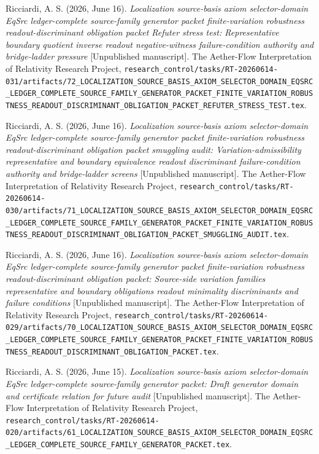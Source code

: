 \documentclass[11pt]{article}
\begin{document}
Ricciardi, A. S. (2026, June 16). \emph{Localization source-basis axiom
selector-domain EqSrc ledger-complete source-family generator packet
finite-variation robustness readout-discriminant obligation packet
Refuter stress test: Representative boundary quotient inverse readout
negative-witness failure-condition authority and bridge-ladder
pressure} [Unpublished manuscript]. The Aether-Flow Interpretation of
Relativity Research Project,
\texttt{research\_control/tasks/RT-20260614-031/artifacts/72\_LOCALIZATION\_SOURCE\_BASIS\_AXIOM\_SELECTOR\_DOMAIN\_EQSRC\_LEDGER\_COMPLETE\_SOURCE\_FAMILY\_GENERATOR\_PACKET\_FINITE\_VARIATION\_ROBUSTNESS\_READOUT\_DISCRIMINANT\_OBLIGATION\_PACKET\_REFUTER\_STRESS\_TEST.tex}.

Ricciardi, A. S. (2026, June 16). \emph{Localization source-basis axiom
selector-domain EqSrc ledger-complete source-family generator packet
finite-variation robustness readout-discriminant obligation packet
smuggling audit: Variation-admissibility representative and boundary
equivalence readout discriminant failure-condition authority and
bridge-ladder screens} [Unpublished manuscript]. The Aether-Flow
Interpretation of Relativity Research Project,
\texttt{research\_control/tasks/RT-20260614-030/artifacts/71\_LOCALIZATION\_SOURCE\_BASIS\_AXIOM\_SELECTOR\_DOMAIN\_EQSRC\_LEDGER\_COMPLETE\_SOURCE\_FAMILY\_GENERATOR\_PACKET\_FINITE\_VARIATION\_ROBUSTNESS\_READOUT\_DISCRIMINANT\_OBLIGATION\_PACKET\_SMUGGLING\_AUDIT.tex}.

Ricciardi, A. S. (2026, June 16). \emph{Localization source-basis axiom
selector-domain EqSrc ledger-complete source-family generator packet
finite-variation robustness readout-discriminant obligation packet:
Source-side variation families representative and boundary obligations
readout minimality discriminants and failure conditions} [Unpublished
manuscript]. The Aether-Flow Interpretation of Relativity Research
Project,
\texttt{research\_control/tasks/RT-20260614-029/artifacts/70\_LOCALIZATION\_SOURCE\_BASIS\_AXIOM\_SELECTOR\_DOMAIN\_EQSRC\_LEDGER\_COMPLETE\_SOURCE\_FAMILY\_GENERATOR\_PACKET\_FINITE\_VARIATION\_ROBUSTNESS\_READOUT\_DISCRIMINANT\_OBLIGATION\_PACKET.tex}.

Ricciardi, A. S. (2026, June 15). \emph{Localization source-basis axiom
selector-domain EqSrc ledger-complete source-family generator packet:
Draft generator domain and certificate relation for future audit}
[Unpublished manuscript]. The Aether-Flow Interpretation of Relativity
Research Project,
\texttt{research\_control/tasks/RT-20260614-020/artifacts/61\_LOCALIZATION\_SOURCE\_BASIS\_AXIOM\_SELECTOR\_DOMAIN\_EQSRC\_LEDGER\_COMPLETE\_SOURCE\_FAMILY\_GENERATOR\_PACKET.tex}.
\end{document}
